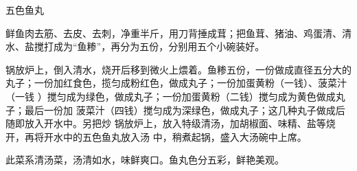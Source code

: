 \begin{recipe}[五福鱼丸]{五色鱼丸}

\ingredients


\preparation

\step 鲜鱼肉去筋、去皮、去刺，净重半斤，用刀背捶成茸；把鱼茸、猪油、鸡蛋清、清
水、盐搅打成为“鱼糁”，再分为五份，分别用五个小碗装好。

\step 锅放炉上，倒入清水，烧开后移到微火上煨着。鱼糁五份，一份做成直径五分大的
丸子；一份加红食色，揽匀成粉红色，做成丸子；一份加蛋黄粉（一钱）、菠菜汁（一钱
）搅匀成为绿色，做成丸子；一份加蛋黄粉（二钱）搅匀成为黄色做成丸子；最后一份加
菠菜汁（四钱）搅匀成为深绿色，做成丸子；这几种丸子做成后随即放入开水中。另把炒
锅放炉上，放入特级清汤，加胡椒面、味精、盐等烧开，再将开水中的五色鱼丸放入汤
中，稍煮起锅，盛入大汤碗中上席。

\features

此菜系清汤菜，汤清如水，味鲜爽口。鱼丸色分五彩，鲜艳美观。

\end{recipe}

